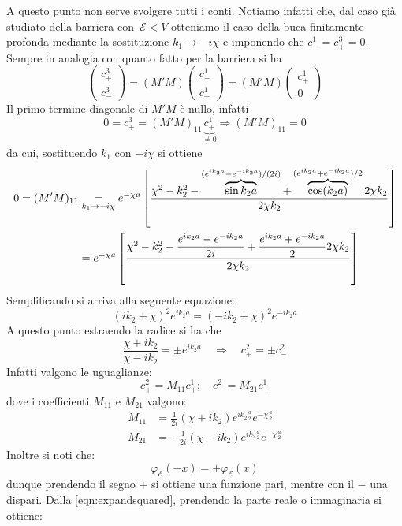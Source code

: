 \documentclass[../../FisicaTeorica.tex]{subfiles}
\begin{document}
A questo punto non serve svolgere tutti i conti. Notiamo infatti che, dal caso già studiato della barriera con\ $\mathcal{E}<\bar{V}$ otteniamo il caso della buca finitamente profonda mediante la sostituzione $k_1 \to -i\chi$ e imponendo che $c^1_- = c^3_+ = 0$. Sempre in analogia con quanto fatto per la barriera si ha
\[
\begin{pmatrix}
c^3_+\\
c^3_-
\end{pmatrix} = (M'M)
\begin{pmatrix}
c^1_+\\
c^1_-
\end{pmatrix}
= (M'M)
\begin{pmatrix}
c^1_+\\
0
\end{pmatrix}
\]
Il primo termine diagonale di $M'M$ è nullo, infatti
\[
0 = c^3_+ = (M'M)_{11} \underbrace{c^1_+}_{\neq 0} \Rightarrow (M'M)_{11}=0 
\]
da cui, sostituendo $k_1$ con $-i \chi$ si ottiene
\begin{align}
0 = (M'M)_{11} & \underset{k_1\to-i\chi}{=}e^{-\chi a}
\left [
\frac{\chi^2-k_2^2-\overbrace{\sin k_2 a}^{(e^{ik_2 a}-e^{-ik_2 a})/(2i)} + \overbrace{\cos(k_2 a)}^{(e^{ik_2 a}+e^{-ik_2 a})/2} 2\chi k_2}{2\chi k_2}
\right ] \notag \\
& = e^{-\chi a}
\left [
\frac{\chi^2-k_2^2- \displaystyle\frac{e^{ik_2 a}-e^{-ik_2 a}}{2i} + \displaystyle\frac{e^{ik_2 a}+e^{-ik_2 a}}{2} 2\chi k_2}{2\chi k_2}
\right ] \notag
\end{align}
Semplificando si arriva alla seguente equazione:
\begin{equation}
\label{eqn:expandsquared}
(ik_2 + \chi)^2 e^{ik_2 a}=(-ik_2 + \chi)^2 e^{-ik_2 a}
\end{equation}
A questo punto estraendo la radice si ha che
\[
\frac{\chi + ik_2}{\chi-ik_2} = \pm e^{ik_2 a} \quad \Rightarrow \quad c^2_+ = \pm c^2_-
\]
Infatti valgono le uguaglianze:
\[
c^2_+ = M_{11}c^1_+; \quad c^2_- = M_{21} c^1_+
\]
dove i coefficienti $M_{11}$ e $M_{21}$ valgono:
\begin{align*}
M_{11} &= \frac{1}{2i}(\chi + ik_2)e^{ik_2 \frac{a}{2}}e^{-\chi\frac{a}{2}}\\
M_{21} &= -\frac{1}{2i}(\chi-ik_2)e^{ik_2 \frac{a}{2}}e^{-\chi\frac{a}{2}}
\end{align*}
Inoltre si noti che:
\[
\varphi_\mathcal{E}(-x)=\pm \varphi_\mathcal{E}(x)
\]
dunque prendendo il segno $+$ si ottiene una funzione pari, mentre con il $-$ una dispari. Dalla \eqref{eqn:expandsquared}, prendendo la parte reale o immaginaria si ottiene:
\end{document}
